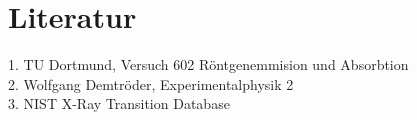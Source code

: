 \section{Literatur}
\label{Literatur}
1. TU Dortmund, Versuch 602 Röntgenemmision und Absorbtion\\
2. Wolfgang Demtröder, Experimentalphysik 2\\
3. NIST X-Ray Transition Database 


